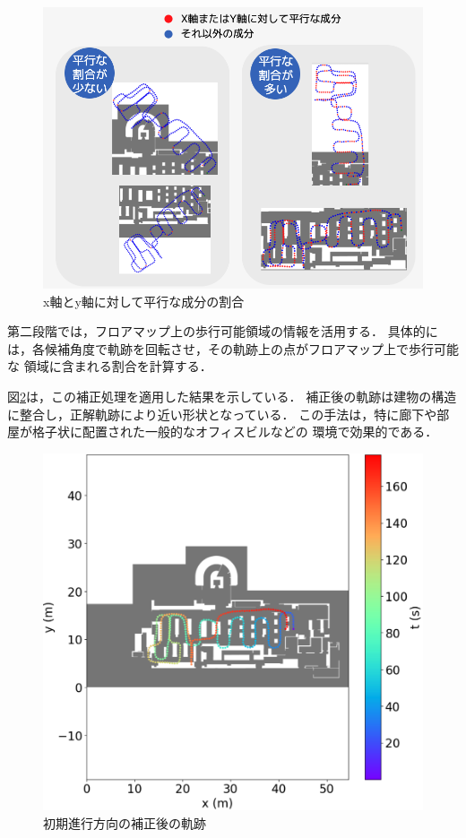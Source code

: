 \begin{figure}[H]
	\centering
	\includegraphics[width=\linewidth]{image/parallel.jpg}
	\caption{x軸とy軸に対して平行な成分の割合}    \label{fig:parallel}
\end{figure}

第二段階では，フロアマップ上の歩行可能領域の情報を活用する．
具体的には，各候補角度で軌跡を回転させ，その軌跡上の点がフロアマップ上で歩行可能な
領域に含まれる割合を計算する．

図\ref{fig:pdr-rotate}は，この補正処理を適用した結果を示している．
補正後の軌跡は建物の構造に整合し，正解軌跡により近い形状となっている．
この手法は，特に廊下や部屋が格子状に配置された一般的なオフィスビルなどの
環境で効果的である．

\begin{figure}[H]
	\centering
	\includegraphics[width=\linewidth]{image/pdr-rotate.jpg}
	\caption{初期進行方向の補正後の軌跡}    \label{fig:pdr-rotate}
\end{figure}



